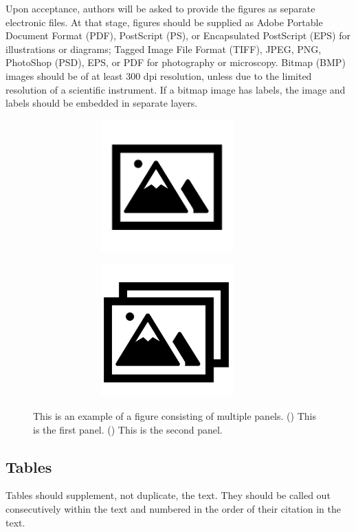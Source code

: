\documentclass{article}
\begin{document}
Upon acceptance, authors will be asked to provide the figures as separate electronic files. At that stage, figures should be supplied as Adobe Portable Document Format (PDF), PostScript (PS), or Encapsulated PostScript (EPS) for illustrations or diagrams; Tagged Image File Format (TIFF), JPEG, PNG, PhotoShop (PSD), EPS, or PDF for photography or microscopy. Bitmap (BMP) images should be of at least 300 dpi resolution, unless due to the limited resolution of a scientific instrument. If a bitmap image has labels, the image and labels should be embedded in separate layers.
\begin{figure}[h]
    \centering
    \begin{subfigure}{0.4\textwidth}
        \includegraphics[width=0.9\textwidth, height=2in]{fig 1}
        \caption{\label{fig:2a}}
    \end{subfigure}
    \begin{subfigure}{0.4\textwidth}
        \includegraphics[width=0.9\textwidth, height=2in]{fig 2}
        \caption{\label{fig:2b}}
    \end{subfigure}
    \caption{This is an example of a figure consisting of multiple panels.     () This is the first panel. () This is the second panel.}
    \label{fig:2}
\end{figure}

\subsection*{Tables}
Tables should supplement, not duplicate, the text. They should be called out consecutively within the text and numbered in the order of their citation in the text. 
\end{document}
